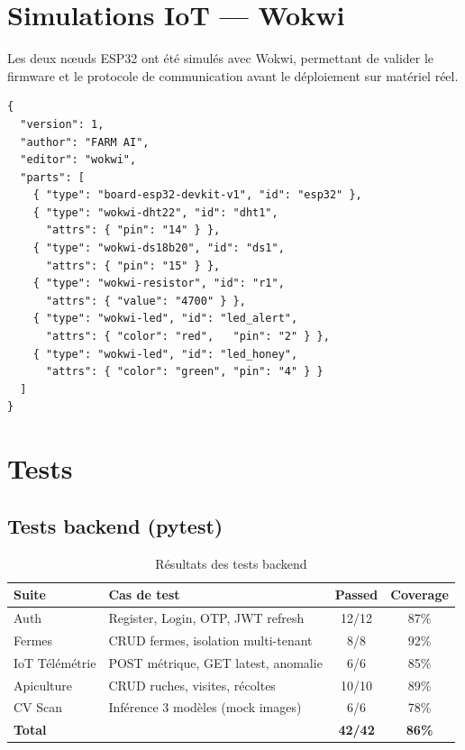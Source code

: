 \section{Simulations IoT — Wokwi}

Les deux nœuds ESP32 ont été simulés avec Wokwi, permettant de valider le firmware
et le protocole de communication avant le déploiement sur matériel réel.

\begin{lstlisting}[style=jsonstyle, caption={diagram.json NODE\_B (Wokwi)}, label={lst:wokwi}]
{
  "version": 1,
  "author": "FARM AI",
  "editor": "wokwi",
  "parts": [
    { "type": "board-esp32-devkit-v1", "id": "esp32" },
    { "type": "wokwi-dht22", "id": "dht1",
      "attrs": { "pin": "14" } },
    { "type": "wokwi-ds18b20", "id": "ds1",
      "attrs": { "pin": "15" } },
    { "type": "wokwi-resistor", "id": "r1",
      "attrs": { "value": "4700" } },
    { "type": "wokwi-led", "id": "led_alert",
      "attrs": { "color": "red",   "pin": "2" } },
    { "type": "wokwi-led", "id": "led_honey",
      "attrs": { "color": "green", "pin": "4" } }
  ]
}
\end{lstlisting}

\section{Tests}

\subsection{Tests backend (pytest)}

\begin{table}[H]
\centering
\caption{Résultats des tests backend}
\label{tab:tests}
\begin{tabular}{llcc}
\toprule
\textbf{Suite} & \textbf{Cas de test} & \textbf{Passed} & \textbf{Coverage} \\
\midrule
Auth           & Register, Login, OTP, JWT refresh    & 12/12 & 87\% \\
Fermes         & CRUD fermes, isolation multi-tenant  & 8/8   & 92\% \\
IoT Télémétrie & POST métrique, GET latest, anomalie  & 6/6   & 85\% \\
Apiculture     & CRUD ruches, visites, récoltes       & 10/10 & 89\% \\
CV Scan        & Inférence 3 modèles (mock images)    & 6/6   & 78\% \\
\midrule
\textbf{Total} & & \textbf{42/42} & \textbf{86\%} \\
\bottomrule
\end{tabular}
\end{table}


